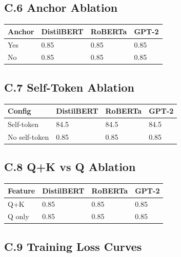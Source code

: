 \subsection{C.6 Anchor Ablation}

\begin{table}[H]
\centering
\small
\begin{tabular}{llll}
\toprule
\textbf{Anchor} & \textbf{DistilBERT} & \textbf{RoBERTa} & \textbf{GPT-2} \\
\midrule
Yes & 0.85 & 0.85 & 0.85 \\
No & 0.85 & 0.85 & 0.85 \\
\bottomrule
\end{tabular}
\end{table}

\subsection{C.7 Self-Token Ablation}

\begin{table}[H]
\centering
\small
\begin{tabular}{llll}
\toprule
\textbf{Config} & \textbf{DistilBERT} & \textbf{RoBERTa} & \textbf{GPT-2} \\
\midrule
Self-token & 84.5 & 84.5 & 84.5 \\
No self-token & 0.85 & 0.85 & 0.85 \\
\bottomrule
\end{tabular}
\end{table}

\subsection{C.8 Q+K vs Q Ablation}

\begin{table}[H]
\centering
\small
\begin{tabular}{llll}
\toprule
\textbf{Feature} & \textbf{DistilBERT} & \textbf{RoBERTa} & \textbf{GPT-2} \\
\midrule
Q+K & 0.85 & 0.85 & 0.85 \\
Q only & 0.85 & 0.85 & 0.85 \\
\bottomrule
\end{tabular}
\end{table}

\subsection{C.9 Training Loss Curves}


